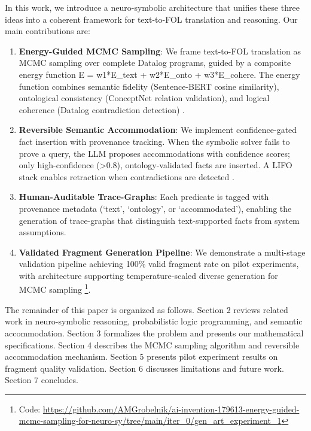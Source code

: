 \documentclass[11pt,letterpaper]{article}
\begin{document}
In this work, we introduce a neuro-symbolic architecture that unifies these three ideas into a coherent framework for text-to-FOL translation and reasoning. Our main contributions are:

\begin{enumerate}
  \item \textbf{Energy-Guided MCMC Sampling}: We frame text-to-FOL translation as MCMC sampling over complete Datalog programs, guided by a composite energy function E = w1*E\_text + w2*E\_onto + w3*E\_cohere. The energy function combines semantic fidelity (Sentence-BERT cosine similarity), ontological consistency (ConceptNet relation validation), and logical coherence (Datalog contradiction detection) \cite{Reimers2019, Speer2017, Ceri1989}.
  
  \item \textbf{Reversible Semantic Accommodation}: We implement confidence-gated fact insertion with provenance tracking. When the symbolic solver fails to prove a query, the LLM proposes accommodations with confidence scores; only high-confidence (>0.8), ontology-validated facts are inserted. A LIFO stack enables retraction when contradictions are detected \cite{Doyle1979, deKleer1986}.
  
  \item \textbf{Human-Auditable Trace-Graphs}: Each predicate is tagged with provenance metadata (`text', `ontology', or `accommodated'), enabling the generation of trace-graphs that distinguish text-supported facts from system assumptions.
  
  \item \textbf{Validated Fragment Generation Pipeline}: We demonstrate a multi-stage validation pipeline achieving 100\% valid fragment rate on pilot experiments, with architecture supporting temperature-scaled diverse generation for MCMC sampling \footnote{Code: \url{https://github.com/AMGrobelnik/ai-invention-179613-energy-guided-mcmc-sampling-for-neuro-sy/tree/main/iter_0/gen_art_experiment_1}}.
\end{enumerate}

The remainder of this paper is organized as follows. Section 2 reviews related work in neuro-symbolic reasoning, probabilistic logic programming, and semantic accommodation. Section 3 formalizes the problem and presents our mathematical specifications. Section 4 describes the MCMC sampling algorithm and reversible accommodation mechanism. Section 5 presents pilot experiment results on fragment quality validation. Section 6 discusses limitations and future work. Section 7 concludes.
\end{document}
